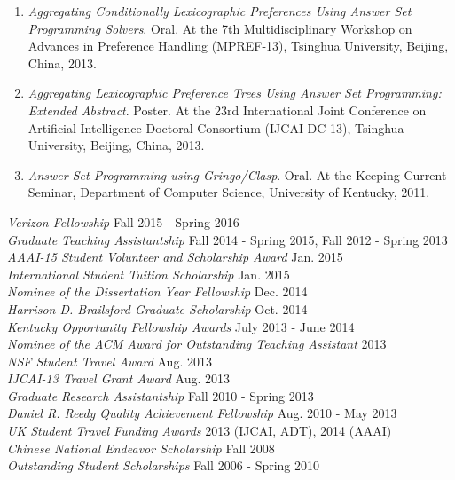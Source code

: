 \begin{enumerate}
	\item \textit{Aggregating Conditionally Lexicographic Preferences Using Answer Set Programming Solvers}. Oral.
		At the 7th Multidisciplinary Workshop on Advances in Preference Handling (MPREF-13),
		Tsinghua University, Beijing, China, 2013.
	\item \textit{Aggregating Lexicographic Preference Trees Using Answer Set Programming: Extended Abstract}. Poster.
		At the 23rd International Joint Conference on Artificial Intelligence 
		Doctoral Consortium (IJCAI-DC-13), Tsinghua University, Beijing, China, 2013.
	\item \textit{Answer Set Programming using Gringo/Clasp}. Oral.
		At the Keeping Current Seminar, Department of Computer Science,
		University of Kentucky, 2011.
\end{enumerate}
\vspace{3pt}

{\sl Verizon Fellowship}  \hfill Fall 2015 - Spring 2016\\
{\sl Graduate Teaching Assistantship}  \hfill Fall 2014 - Spring 2015, Fall 2012 - Spring 2013\\
{\sl AAAI-15 Student Volunteer and Scholarship Award}  \hfill Jan. 2015\\
{\sl International Student Tuition Scholarship}  \hfill Jan. 2015\\
{\sl Nominee of the Dissertation Year Fellowship}  \hfill Dec. 2014\\
{\sl Harrison D. Brailsford Graduate Scholarship}  \hfill Oct. 2014\\
{\sl Kentucky Opportunity Fellowship Awards}  \hfill July 2013 - June 2014\\
{\sl Nominee of the ACM Award for Outstanding Teaching Assistant}  \hfill 2013\\
{\sl NSF Student Travel Award}  \hfill Aug. 2013\\
{\sl IJCAI-13 Travel Grant Award}  \hfill Aug. 2013\\
{\sl Graduate Research Assistantship}  \hfill Fall 2010 - Spring 2013\\
{\sl Daniel R. Reedy Quality Achievement Fellowship} \hfill Aug. 2010 - May 2013\\
{\sl UK Student Travel Funding Awards}  \hfill 2013 (IJCAI, ADT), 2014 (AAAI)\\
{\sl Chinese National Endeavor Scholarship} \hfill Fall 2008\\
{\sl Outstanding Student Scholarships} \hfill Fall 2006 -  Spring 2010
\vspace{3pt}

